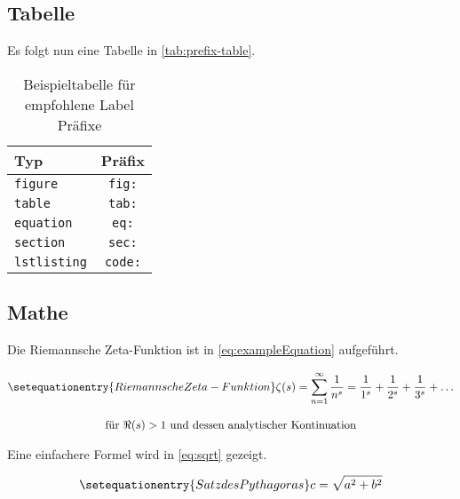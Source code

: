 \lipsum[11]
\lipsum[12]

\subsection{Tabelle}
\label{sec:tables}

Es folgt nun eine Tabelle in \autoref{tab:prefix-table}.

\begin{table}[ht]
    \centering
    \begin{tabular}{|l|c|}
        \hline
        \textbf{Typ} & \textbf{Präfix} \\
        \hline \hline
        \texttt{figure} & \texttt{fig:} \\
        \texttt{table} & \texttt{tab:} \\
        \texttt{equation} & \texttt{eq:} \\
        \texttt{section} & \texttt{sec:} \\
        \texttt{lstlisting} & \texttt{code:} \\
        \hline
    \end{tabular}
    \caption{Beispieltabelle für empfohlene Label Präfixe}
    \label{tab:prefix-table}
\end{table}

\subsection{Mathe}

Die Riemannsche Zeta-Funktion ist in \autoref{eq:exampleEquation} aufgeführt.

\begin{equation}
\begin{gathered}
    \setequationentry{Riemannsche Zeta-Funktion}
\zeta(s) = \sum_{n=1}^{\infty} \frac{1}{n^s} = \frac{1}{1^s} + \frac{1}{2^s} + \frac{1}{3^s} + \ldots \\[2ex]
\text{für } \Re(s) > 1 \text{ und dessen analytischer Kontinuation}
\end{gathered}
\label{eq:exampleEquation}
\end{equation}

Eine einfachere Formel wird in \autoref{eq:sqrt} gezeigt.

\begin{equation}
    \setequationentry{Satz des Pythagoras}
    c = \sqrt{a^{2} + b^{2}}
    \label{eq:sqrt}
\end{equation}

